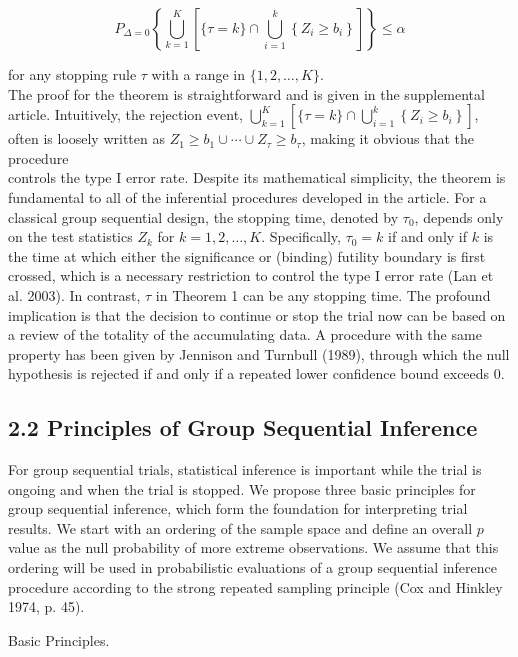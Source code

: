 \documentclass[10pt]{article}
\begin{document}
\begin{equation*}
P_{\Delta=0}\left\{\bigcup_{k=1}^{K}\left[\{\tau=k\} \cap \bigcup_{i=1}^{k}\left\{Z_{i} \geq b_{i}\right\}\right]\right\} \leq \alpha \tag{3}
\end{equation*}


for any stopping rule $\tau$ with a range in $\{1,2, \ldots, K\}$.\\
The proof for the theorem is straightforward and is given in the supplemental article. Intuitively, the rejection event, $\bigcup_{k=1}^{K}\left[\{\tau=k\} \cap \bigcup_{i=1}^{k}\left\{Z_{i} \geq b_{i}\right\}\right]$, often is loosely written as $Z_{1} \geq b_{1} \cup \cdots \cup Z_{\tau} \geq b_{\tau}$, making it obvious that the procedure\\
controls the type I error rate. Despite its mathematical simplicity, the theorem is fundamental to all of the inferential procedures developed in the article. For a classical group sequential design, the stopping time, denoted by $\tau_{0}$, depends only on the test statistics $Z_{k}$ for $k=1,2, \ldots, K$. Specifically, $\tau_{0}=k$ if and only if $k$ is the time at which either the significance or (binding) futility boundary is first crossed, which is a necessary restriction to control the type I error rate (Lan et al. 2003). In contrast, $\tau$ in Theorem 1 can be any stopping time. The profound implication is that the decision to continue or stop the trial now can be based on a review of the totality of the accumulating data. A procedure with the same property has been given by Jennison and Turnbull (1989), through which the null hypothesis is rejected if and only if a repeated lower confidence bound exceeds 0.

\subsection*{2.2 Principles of Group Sequential Inference}
For group sequential trials, statistical inference is important while the trial is ongoing and when the trial is stopped. We propose three basic principles for group sequential inference, which form the foundation for interpreting trial results. We start with an ordering of the sample space and define an overall $p$ value as the null probability of more extreme observations. We assume that this ordering will be used in probabilistic evaluations of a group sequential inference procedure according to the strong repeated sampling principle (Cox and Hinkley 1974, p. 45).

Basic Principles.
\end{document}
